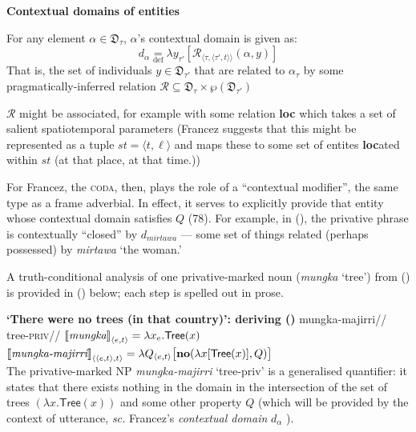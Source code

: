 \pex \textbf{Contextual domains of entities} \citep[from][71]{Francez2007}

For any element $ \alpha\in\mathfrak D_\tau$, $ \alpha $'s contextual domain is given as:
$$ d_\alpha\underset{\text{def}}{=} \lambda y_{\tau'}[\mathcal R_{\langle\tau,\langle\tau',t\rangle\rangle}(\alpha,y)]$$
That is, the set of individuals $ y\in\mathfrak D_{\tau'} $ that are related to $ \alpha_\tau $ by some pragmatically-inferred relation $ \mathcal R\subseteq \mathfrak{D_\tau\times\wp{(D_{\tau'})}} $

\xe

\noindent $ \mathcal R $ might be associated, for example with some relation \textbf{loc} which takes a set of salient spatiotemporal parameters (Francez suggests that this might be represented as a tuple $ st=\langle t,\ell\rangle $ and maps these to some set of entites \textbf{loc}ated within $ st $ (at that place, at that time.))

For Francez, the \textsc{coda}, then, plays the role of a ``contextual modifier'', the same type as a frame adverbial. In effect, it serves to explicitly provide that entity whose contextual domain satisfies $ Q $ (78). For example, in (), the privative phrase is contextually ``closed'' by $ d_{\textit{mirtawa}} $ --- some set of things related (perhaps possessed) by \textit{mirtawa} `the woman.'


A truth-conditional analysis of one privative-marked noun (\textit{mungka} `tree') from () is provided in () below; each step is spelled out in prose.

\pex \textbf{`There were no trees (in that country)': deriving ()}
\a\begingl\gla mungka-majirri//
\glb tree-\textsc{priv}//
\endgl
\a $\llbracket{\textit{mungka}}\rrbracket^{}_{\langle e,t\rangle} =\lambda x_e.\textsf{Tree}(x) $
\a $\llbracket{\textit{mungka-majirri}}\rrbracket^{}_{\langle\langle e,t\rangle,t\rangle}=\lambda Q_{\langle e,t\rangle}\big[\textbf{no}(\lambda x[\mathsf{Tree}(x)],Q)\big]$\label{privsemsF}\\
The privative-marked NP \textit{mungka-majirri} `tree-\gls{priv}' is a generalised quantifier: it states that there exists nothing in the domain in the intersection of the set of trees $(\lambda x.\textsf{Tree}(x))$ and some other property $ Q $ (which will be provided by the context of utterance, \textit{sc.} Francez's \textit{contextual domain} $d_\alpha$ \citeyearpar[71]{Francez2007}).
\a{}\par\nobreak

